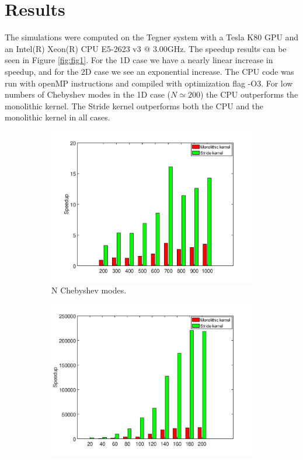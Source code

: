 \documentclass{article}
\begin{document}
\section{Results}
The simulations were computed on the Tegner system with a Tesla K80 GPU and an Intel(R) Xeon(R) CPU E5-2623 v3 @ 3.00GHz. The speedup results can be seen in Figure \ref{fig:fig1}. For the 1D case we have a nearly linear increase in speedup, and for the 2D case we see an exponential increase. The CPU code was run with openMP instructions and compiled with optimization flag -O3. For low numbers of Chebyshev modes in the 1D case ($N \simeq 200$) the CPU outperforms the monolithic kernel. The Stride kernel outperforms both the CPU and the monolithic kernel in all cases.
\begin{figure}[H]
  \centering
  \begin{subfigure}{.48\textwidth}
		\includegraphics[width=\textwidth]{1Dparx.jpg}
		\caption{N Chebyshev modes.}
	\end{subfigure}
	\begin{subfigure}{.48\textwidth}
		\includegraphics[width=\textwidth]{2Dpar.jpg}

\end{subfigure}
\end{figure}
\end{document}
